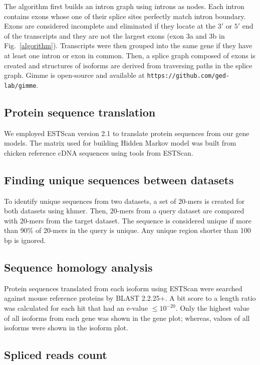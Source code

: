 \documentclass[10pt]{article}
\begin{document}
The algorithm first builds an intron graph using introns as nodes.
Each intron contains exons whose one of their splice sites perfectly match intron boundary.
Exons are considered incomplete and eliminated if they locate at the $3'$ or $5'$ end of the transcripts and
they are not the largest exons (exon 3a and 3b in Fig.~\ref{algorithm}).
Transcripts were then grouped into the same gene if they have at least one intron or exon in common.
Then, a splice graph composed of exons is created and structures of isoforms are derived from traversing paths in the splice graph.
Gimme is open-source and available at \texttt{https://github.com/ged-lab/gimme}.

\subsection*{Protein sequence translation}

We employed ESTScan version 2.1 to translate protein sequences from our gene models.
The matrix used for building Hidden Markov model was built from chicken reference cDNA sequences using tools from ESTScan.

\subsection*{Finding unique sequences between datasets}

To identify unique sequences from two datasets, a set of 20-mers is created for both datasets using
khmer\cite{khmer}.
Then, 20-mers from a query dataset are compared with 20-mers from the target dataset.
The sequence is considered unique if more than 90\% of 20-mers in the query is unique.
Any unique region shorter than 100 bp is ignored.

\subsection*{Sequence homology analysis}

Protein sequences translated from each isoform using ESTScan were searched against mouse reference proteins by BLAST 2.2.25+\cite{Tatusova:1999tz}.
A bit score to a length ratio was calculated for each hit that had an e-value $\le 10^{-20}$.
Only the highest value of all isoforms from each gene was shown in the gene plot; whereas, values of all isoforms were shown in the isoform plot.

\subsection*{Spliced reads count}
\end{document}
